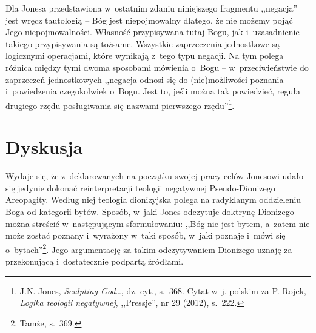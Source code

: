 Dla Jonesa przedstawiona w~ostatnim zdaniu niniejszego fragmentu ,,negacja'' jest wręcz tautologią -- Bóg jest niepojmowalny dlatego, że nie możemy pojąć Jego niepojmowalności. Własność przypisywana tutaj Bogu, jak i~uzasadnienie takiego przypisywania są tożsame. Wszystkie zaprzeczenia jednostkowe są logicznymi operacjami, które wynikają z~tego typu negacji. Na tym polega różnica między tymi dwoma sposobami mówienia o~Bogu -- w~przeciwieństwie do zaprzeczeń jednostkowych ,,negacja odnosi się do (nie)możliwości poznania i~powiedzenia czegokolwiek o~Bogu. Jest to, jeśli można tak powiedzieć, reguła drugiego rzędu posługiwania się nazwami pierwszego rzędu''\footnote{J.N. Jones, \textit{Sculpting God}\ldots, dz. cyt., s.~368. Cytat w~j. polskim za P. Rojek, \textit{Logika teologii negatywnej}, ,,Pressje'', nr 29 (2012), s.~222.}.


\section{Dyskusja}

Wydaje się, że z~deklarowanych na początku swojej pracy celów Jonesowi udało się jedynie dokonać reinterpretacji teologii negatywnej Pseudo-Dionizego Areopagity. Według niej teologia dionizyjska polega na radyklanym oddzieleniu Boga od kategorii bytów. Sposób, w~jaki Jones odczytuje doktrynę Dionizego można streścić w~następującym sformułowaniu: ,,Bóg nie jest bytem, a~zatem nie może zostać poznany i~wyrażony w~taki sposób, w~jaki poznaje i~mówi się o~bytach''\footnote{Tamże, s.~369.}. Jego argumentację za takim odczytywaniem Dionizego uznaję za przekonującą i~dostatecznie podpartą źródłami.


